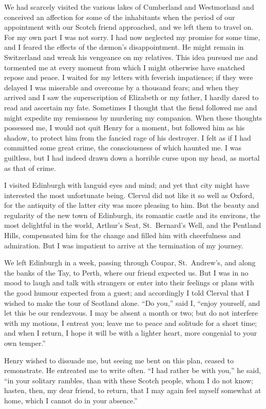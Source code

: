 \documentclass[12pt,openright]{book}
\begin{document}
We had scarcely visited the various lakes of Cumberland and Westmorland and conceived an affection for some of the inhabitants when the period of our appointment with our Scotch friend approached, and we left them to travel on. For my own part I was not sorry. I had now neglected my promise for some time, and I feared the effects of the dæmon’s disappointment. He might remain in Switzerland and wreak his vengeance on my relatives. This idea pursued me and tormented me at every moment from which I might otherwise have snatched repose and peace. I waited for my letters with feverish impatience; if they were delayed I was miserable and overcome by a thousand fears; and when they arrived and I saw the superscription of Elizabeth or my father, I hardly dared to read and ascertain my fate. Sometimes I thought that the fiend followed me and might expedite my remissness by murdering my companion. When these thoughts possessed me, I would not quit Henry for a moment, but followed him as his shadow, to protect him from the fancied rage of his destroyer. I felt as if I had committed some great crime, the consciousness of which haunted me. I was guiltless, but I had indeed drawn down a horrible curse upon my head, as mortal as that of crime.

I visited Edinburgh with languid eyes and mind; and yet that city might have interested the most unfortunate being. Clerval did not like it so well as Oxford, for the antiquity of the latter city was more pleasing to him. But the beauty and regularity of the new town of Edinburgh, its romantic castle and its environs, the most delightful in the world, Arthur’s Seat, St. Bernard’s Well, and the Pentland Hills, compensated him for the change and filled him with cheerfulness and admiration. But I was impatient to arrive at the termination of my journey.

We left Edinburgh in a week, passing through Coupar, St. Andrew’s, and along the banks of the Tay, to Perth, where our friend expected us. But I was in no mood to laugh and talk with strangers or enter into their feelings or plans with the good humour expected from a guest; and accordingly I told Clerval that I wished to make the tour of Scotland alone. “Do you,” said I, “enjoy yourself, and let this be our rendezvous. I may be absent a month or two; but do not interfere with my motions, I entreat you; leave me to peace and solitude for a short time; and when I return, I hope it will be with a lighter heart, more congenial to your own temper.”

Henry wished to dissuade me, but seeing me bent on this plan, ceased to remonstrate. He entreated me to write often. “I had rather be with you,” he said, “in your solitary rambles, than with these Scotch people, whom I do not know; hasten, then, my dear friend, to return, that I may again feel myself somewhat at home, which I cannot do in your absence.”
\end{document}
